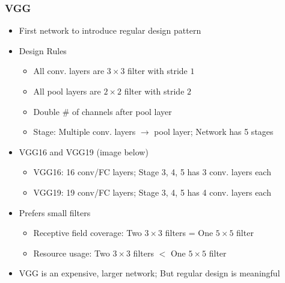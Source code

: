 \subsubsection*{VGG}
\begin{itemize}
    \item First network to introduce regular design pattern
    \item Design Rules
    \begin{itemize}
        \item All conv. layers are $3\times3$ filter with stride $1$
        \item All pool layers are $2\times2$ filter with stride $2$
        \item Double \# of channels after pool layer
        \item Stage: Multiple conv. layers $\rightarrow$ pool layer; Network has 5 stages
    \end{itemize}
    \item VGG16 and VGG19 (image below)
    \begin{itemize}
        \item VGG16: 16 conv/FC layers; Stage 3, 4, 5 has 3 conv. layers each
        \item VGG19: 19 conv/FC layers; Stage 3, 4, 5 has 4 conv. layers each
    \end{itemize}
    \item Prefers small filters
    \begin{itemize}
        \item Receptive field coverage: Two $3\times3$ filters = One $5\times5$ filter
        \item Resource usage: Two $3\times3$ filters $<$ One $5\times5$ filter
    \end{itemize}
    \item VGG is an expensive, larger network; But regular design is meaningful
\end{itemize}
\begin{figures}
\end{figures}

